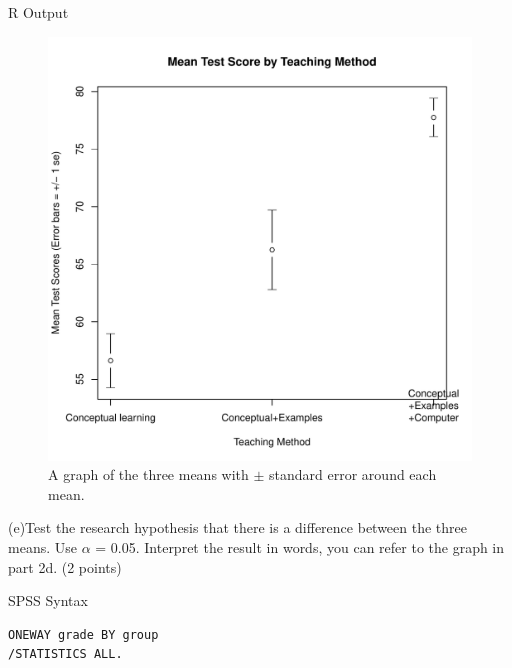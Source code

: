 \documentclass[11pt, oneside]{article}   	%
\begin{document}
R Output
\begin{figure}[h!]
  \centering
  \includegraphics[width=0.65\linewidth]{2dplotR.pdf}
  \caption{A graph of the three means with $\pm$ standard error around each mean.}
  \label{fig:R1}
\end{figure}

(e)Test the research hypothesis that there is a difference between the three means. Use $\alpha$ = 0.05. Interpret the result in words, you can refer to the graph in part 2d. (2 points)

SPSS Syntax
\begin{lstlisting}[style=SPSSstyle]
ONEWAY grade BY group  
/STATISTICS ALL.
\end{lstlisting}
\end{document}
